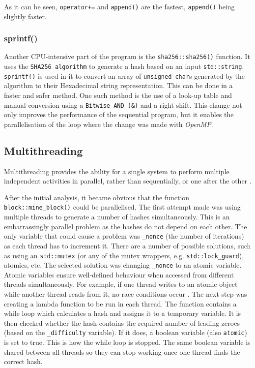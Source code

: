 \documentclass[12pt, a4paper]{article}
\begin{document}
    As it can be seen, \texttt{operator+=} and \texttt{append()} are the fastest, \texttt{append()} being slightly faster.

    \subsubsection{sprintf()}
    Another CPU-intensive part of the program is the \texttt{sha256::sha256()} function. It uses the \texttt{SHA256 algorithm} to generate a hash based on an input \texttt{std::string}. \texttt{sprintf()} is used in it to convert an array of \texttt{unsigned char}s generated by the algorithm to their Hexadecimal string representation. This can be done in a faster and safer \cite{buffOverflow} method. One such method is the use of a look-up table and manual conversion \cite{SOconversion} using a \texttt{Bitwise AND (\&)} and a right shift. This change not only improves the performance of the sequential program, but it enables the parallelisation of the loop where the change was made with \textit{OpenMP}.

    \subsection{Multithreading}
    Multithreading provides the ability for a single system to perform multiple independent activities in parallel, rather than sequentially, or one after the other \cite{williams2012c++}. 

    After the initial analysis, it became obvious that the function \texttt{block::mine\_block()} could be parallelised. The first attempt made was using multiple threads to generate a number of hashes simultaneously. This is an embarrassingly parallel problem as the hashes do not depend on each other. The only variable that could cause a problem was \texttt{\_nonce} (the number of iterations) as each thread has to increment it. There are a number of possible solutions, such as using an \texttt{std::mutex} (or any of the mutex wrappers, e.g. \texttt{std::lock\_guard}), atomics, etc. The selected solution was changing \texttt{\_nonce} to an atomic variable. Atomic variables ensure well-defined behaviour when accessed from different threads simultaneously. For example, if one thread writes to an atomic object while another thread reads from it, no race conditions occur \cite{atomicc++}. The next step was creating a lambda function to be run in each thread. The function contains a while loop which calculates a hash and assigns it to a temporary variable. It is then checked whether the hash contains the required number of leading zeroes (based on the \texttt{\_difficulty} variable). If it does, a boolean variable (also \texttt{atomic}) is set to true. This is how the while loop is stopped. The same boolean variable is shared between all threads so they can stop working once one thread finds the correct hash.
\end{document}
